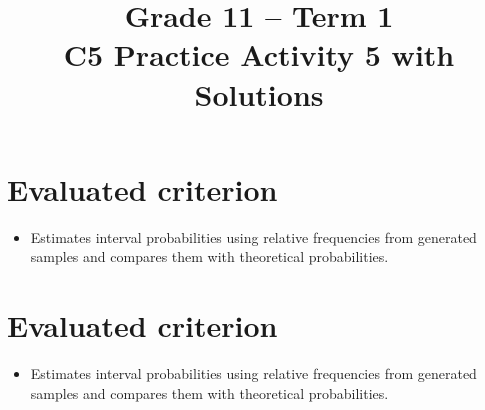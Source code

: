 \makeatletter
{}
\makeatother






\usepackage{longtable}


\setlength{\DistributionGraphWidth}{0.6\textwidth}
\setlength{\DistributionGraphHeight}{6cm}

\title{Grade 11 -- Term 1 \\ C5 Practice Activity 5 with Solutions}
\author{}
\date{}

\pagestyle{empty}





	
	\maketitle
	\setcounter{tocdepth}{1}
	\setcounter{secnumdepth}{2}
	\label{toc}
	\tableofcontents
	
	\section*{Evaluated criterion}
	\begin{itemize}
		\item [\textbf{C6.}] Estimates interval probabilities using relative frequencies from generated samples and compares them with theoretical probabilities.
	\end{itemize}
	
	\vspace{-4mm}
	
		\section*{Evaluated criterion}
	\begin{itemize}
		\item [\textbf{C6.}] Estimates interval probabilities using relative frequencies from generated samples and compares them with theoretical probabilities.
	\end{itemize}
	
	\vspace{-4mm}
	
